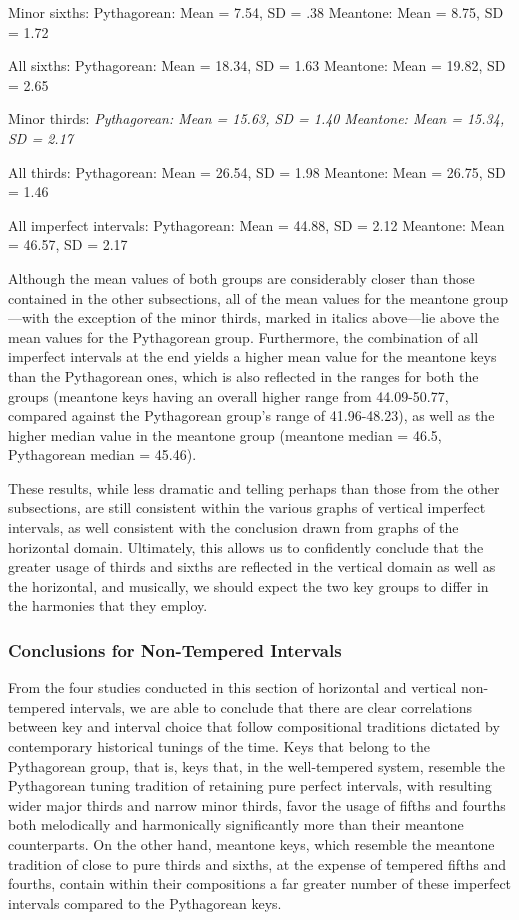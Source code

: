 Minor sixths: Pythagorean: Mean = 7.54, SD = .38 Meantone: Mean = 8.75,
SD = 1.72

All sixths: Pythagorean: Mean = 18.34, SD = 1.63 Meantone: Mean = 19.82,
SD = 2.65

Minor thirds: \emph{Pythagorean: Mean = 15.63, SD = 1.40}
\emph{Meantone: Mean = 15.34, SD = 2.17}

All thirds: Pythagorean: Mean = 26.54, SD = 1.98 Meantone: Mean = 26.75,
SD = 1.46

All imperfect intervals: Pythagorean: Mean = 44.88, SD = 2.12 Meantone:
Mean = 46.57, SD = 2.17

Although the mean values of both groups are considerably closer than
those contained in the other subsections, all of the mean values for the
meantone group---with the exception of the minor thirds, marked in
italics above---lie above the mean values for the Pythagorean group.
Furthermore, the combination of all imperfect intervals at the end
yields a higher mean value for the meantone keys than the Pythagorean
ones, which is also reflected in the ranges for both the groups
(meantone keys having an overall higher range from 44.09-50.77, compared
against the Pythagorean group's range of 41.96-48.23), as well as the
higher median value in the meantone group (meantone median = 46.5,
Pythagorean median = 45.46).

These results, while less dramatic and telling perhaps than those from
the other subsections, are still consistent within the various graphs of
vertical imperfect intervals, as well consistent with the conclusion
drawn from graphs of the horizontal domain. Ultimately, this allows us
to confidently conclude that the greater usage of thirds and sixths are
reflected in the vertical domain as well as the horizontal, and
musically, we should expect the two key groups to differ in the
harmonies that they employ.

\subsubsection{Conclusions for Non-Tempered
Intervals}\label{conclusions-for-non-tempered-intervals}

From the four studies conducted in this section of horizontal and
vertical non-tempered intervals, we are able to conclude that there are
clear correlations between key and interval choice that follow
compositional traditions dictated by contemporary historical tunings of
the time. Keys that belong to the Pythagorean group, that is, keys that,
in the well-tempered system, resemble the Pythagorean tuning tradition
of retaining pure perfect intervals, with resulting wider major thirds
and narrow minor thirds, favor the usage of fifths and fourths both
melodically and harmonically significantly more than their meantone
counterparts. On the other hand, meantone keys, which resemble the
meantone tradition of close to pure thirds and sixths, at the expense of
tempered fifths and fourths, contain within their compositions a far
greater number of these imperfect intervals compared to the Pythagorean
keys.

